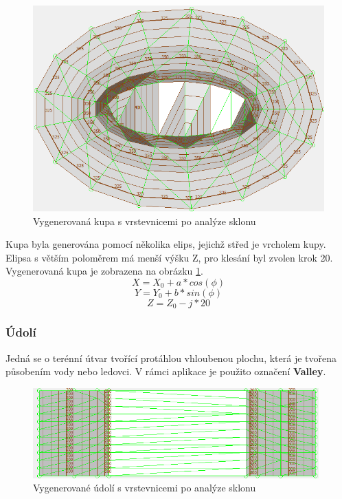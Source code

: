 \documentclass[a4paper,11pt,twoside]{article}
\begin{document}
\vspace{0.2cm}
\begin{figure}[hbt!] 
\begin{center}
\includegraphics[width=12cm]{pictures/hill_panchromatic_slope.PNG} 
\caption[Vygenerovaná kupa s vrstevnicemi po analýze sklonu]{Vygenerovaná kupa s vrstevnicemi po analýze sklonu}
\label{fig:hill_panchromatic_slope}
\end{center}
\end{figure}

\indent Kupa byla generována pomocí několika elips, jejichž střed je vrcholem kupy. Elipsa s větším poloměrem má menší výšku Z, pro klesání byl zvolen krok 20. Vygenerovaná kupa je zobrazena na obrázku \ref{fig:hill_panchromatic_slope}.
$$
X = X_0 + a * cos(\phi)
$$
$$
Y = Y_0 + b * sin(\phi)
$$
$$
Z = Z_0 - j* 20
$$



\subsubsection{Údolí}
Jedná se o terénní útvar tvořící protáhlou vhloubenou plochu, která je tvořena působením vody nebo ledovci. V rámci aplikace je použito označení \textbf{Valley}.

\vspace{0.2cm}
\begin{figure}[hbt!] 
\begin{center}
\includegraphics[width=11cm]{pictures/valley_panchromatic_slope.PNG} 
\caption[Vygenerované údolí s vrstevnicemi po analýze sklonu]{Vygenerované údolí s vrstevnicemi po analýze sklonu}
\label{fig:valley_panchromatic_slope}
\end{center}
\end{figure}
\end{document}
